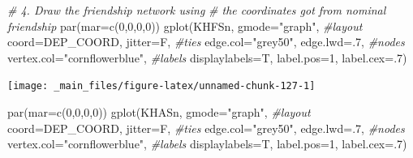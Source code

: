 \documentclass[
  notitlepage,
  onecolumn,
  openany]{book}
\newenvironment{Shaded}{\begin{snugshade}}{\end{snugshade}}
\newcommand{\AttributeTok}[1]{\textcolor[rgb]{0.77,0.63,0.00}{#1}}
\newcommand{\CommentTok}[1]{\textcolor[rgb]{0.56,0.35,0.01}{\textit{#1}}}
\newcommand{\DecValTok}[1]{\textcolor[rgb]{0.00,0.00,0.81}{#1}}
\newcommand{\FunctionTok}[1]{\textcolor[rgb]{0.00,0.00,0.00}{#1}}
\newcommand{\NormalTok}[1]{#1}
\newcommand{\StringTok}[1]{\textcolor[rgb]{0.31,0.60,0.02}{#1}}
\begin{document}
\begin{Shaded}
\begin{Highlighting}[]
\CommentTok{\# 4. Draw the friendship network using }
\CommentTok{\#    the coordinates got from nominal friendship}
\FunctionTok{par}\NormalTok{(}\AttributeTok{mar=}\FunctionTok{c}\NormalTok{(}\DecValTok{0}\NormalTok{,}\DecValTok{0}\NormalTok{,}\DecValTok{0}\NormalTok{,}\DecValTok{0}\NormalTok{))}
\FunctionTok{gplot}\NormalTok{(KHFSn,}
      \AttributeTok{gmode=}\StringTok{"graph"}\NormalTok{,}
      \CommentTok{\#layout}
      \AttributeTok{coord=}\NormalTok{DEP\_COORD,}
      \AttributeTok{jitter=}\NormalTok{F,}
      \CommentTok{\#ties}
      \AttributeTok{edge.col=}\StringTok{"grey50"}\NormalTok{,}
      \AttributeTok{edge.lwd=}\NormalTok{.}\DecValTok{7}\NormalTok{,}
      \CommentTok{\#nodes}
      \AttributeTok{vertex.col=}\StringTok{"cornflowerblue"}\NormalTok{,}
      \CommentTok{\#labels}
      \AttributeTok{displaylabels=}\NormalTok{T, }
      \AttributeTok{label.pos=}\DecValTok{1}\NormalTok{, }
      \AttributeTok{label.cex=}\NormalTok{.}\DecValTok{7}\NormalTok{)}
\end{Highlighting}
\end{Shaded}

\begin{center}\texttt{[image: \_main\_files/figure-latex/unnamed-chunk-127-1]} \end{center}

\begin{Shaded}
\begin{Highlighting}[]
\FunctionTok{par}\NormalTok{(}\AttributeTok{mar=}\FunctionTok{c}\NormalTok{(}\DecValTok{0}\NormalTok{,}\DecValTok{0}\NormalTok{,}\DecValTok{0}\NormalTok{,}\DecValTok{0}\NormalTok{))}
\FunctionTok{gplot}\NormalTok{(KHASn,}
      \AttributeTok{gmode=}\StringTok{"graph"}\NormalTok{,}
      \CommentTok{\#layout}
      \AttributeTok{coord=}\NormalTok{DEP\_COORD,}
      \AttributeTok{jitter=}\NormalTok{F,}
      \CommentTok{\#ties}
      \AttributeTok{edge.col=}\StringTok{"grey50"}\NormalTok{,}
      \AttributeTok{edge.lwd=}\NormalTok{.}\DecValTok{7}\NormalTok{,}
      \CommentTok{\#nodes}
      \AttributeTok{vertex.col=}\StringTok{"cornflowerblue"}\NormalTok{,}
      \CommentTok{\#labels}
      \AttributeTok{displaylabels=}\NormalTok{T, }
      \AttributeTok{label.pos=}\DecValTok{1}\NormalTok{, }
      \AttributeTok{label.cex=}\NormalTok{.}\DecValTok{7}\NormalTok{)}
\end{Highlighting}
\end{Shaded}
\end{document}
